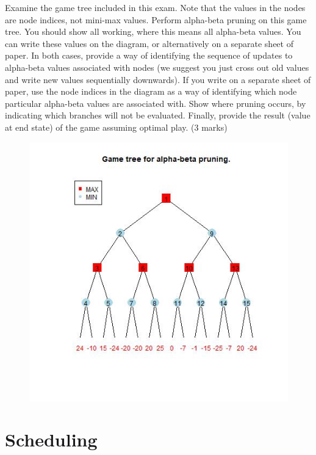 \documentclass{article}
\begin{document}
Examine the game tree included in this exam. Note that the values in the nodes are node indices, not mini-max values. Perform alpha-beta pruning on this game tree.  You should show all working, where this means all alpha-beta values.  You can write these values on the diagram, or alternatively on a separate sheet of paper.  In both cases, provide a way of identifying the sequence of updates to alpha-beta values associated with nodes (we suggest you just cross out old values and write new values sequentially downwards).  If you write on a separate sheet of paper, use the node indices in the diagram as a way of identifying which node particular alpha-beta values are associated with.  Show where pruning occurs, by indicating which branches will not be evaluated.  Finally, provide the result (value at end state) of the game assuming optimal play. (3 marks)

\begin{figure}[h!]
\includegraphics[width=\textwidth]{ab.jpg}
\end{figure}
\clearpage
\section{Scheduling}
\end{document}

